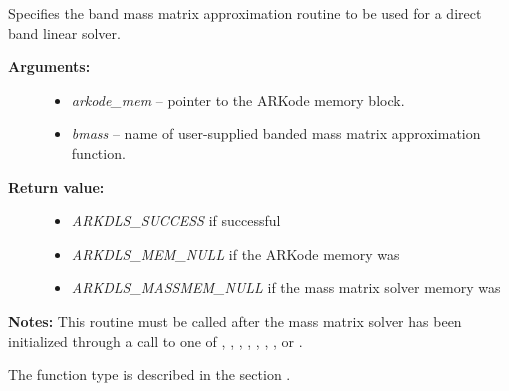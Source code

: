 \documentclass[letterpaper,10pt,english]{sphinxmanual}
\begin{document}
\begin{fulllineitems}
\label{c_interface/User_callable:c.ARKDlsSetBandMassFn}
Specifies the band mass matrix approximation routine to be
used for a direct band linear solver.
\begin{description}
\item[{\textbf{Arguments:}}] \leavevmode\begin{itemize}
\item {} 
\emph{arkode\_mem} -- pointer to the ARKode memory block.

\item {} 
\emph{bmass} -- name of user-supplied banded mass matrix approximation function.

\end{itemize}

\item[{\textbf{Return value:}}] \leavevmode\begin{itemize}
\item {} 
\emph{ARKDLS\_SUCCESS}  if successful

\item {} 
\emph{ARKDLS\_MEM\_NULL}  if the ARKode memory was 

\item {} 
\emph{ARKDLS\_MASSMEM\_NULL} if the mass matrix solver memory was 

\end{itemize}

\end{description}

\textbf{Notes:} This routine must be called after the mass matrix solver
has been initialized through a call to one of
{\hyperref[c_interface/User_callable:c.ARKMassDense]{\emph{}}}, {\hyperref[c_interface/User_callable:c.ARKMassLapackDense]{\emph{}}},
{\hyperref[c_interface/User_callable:c.ARKMassBand]{\emph{}}}, {\hyperref[c_interface/User_callable:c.ARKMassLapackBand]{\emph{}}},
{\hyperref[c_interface/User_callable:c.ARKMassSpgmr]{\emph{}}}, {\hyperref[c_interface/User_callable:c.ARKMassSpbcg]{\emph{}}},
{\hyperref[c_interface/User_callable:c.ARKMassSptfqmr]{\emph{}}}, {\hyperref[c_interface/User_callable:c.ARKMassSpfgmr]{\emph{}}} or
{\hyperref[c_interface/User_callable:c.ARKMassPcg]{\emph{}}}.

The function type {\hyperref[c_interface/User_supplied:c.ARKDlsBandMassFn]{\emph{}}} is described in the section
{\hyperref[c_interface/User_supplied:cinterface-usersupplied]{\emph{}}}.

\end{fulllineitems}
\end{document}
